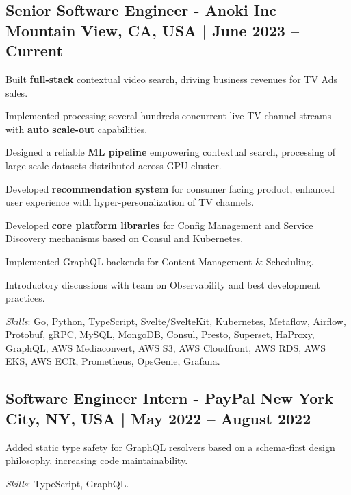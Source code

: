 \subsection{{Senior Software Engineer - Anoki Inc \hfill  Mountain View, CA, USA  | June 2023 -- Current}}
\begin{zitemize}
\item Built \textbf{full-stack} contextual video search, driving business revenues for TV Ads sales.
\item Implemented processing several hundreds concurrent live TV channel streams with \textbf{auto scale-out} capabilities.
\item Designed a reliable \textbf{ML pipeline} empowering contextual search, processing of large-scale datasets distributed across GPU cluster. 
\item Developed \textbf{recommendation system} for consumer facing product, enhanced user experience with hyper-personalization of TV channels.
\item Developed \textbf{core platform libraries} for Config Management and Service Discovery mechanisms based on Consul and Kubernetes.
\item Implemented GraphQL backends for Content Management \& Scheduling.
\item Introductory discussions with team on Observability and best development practices.
\end{zitemize}
\textit{Skills}: Go, Python, TypeScript, Svelte/SvelteKit, Kubernetes, Metaflow, Airflow, Protobuf, gRPC, MySQL, MongoDB, Consul, Presto, Superset, HaProxy, GraphQL, AWS Mediaconvert, AWS S3, AWS Cloudfront, AWS RDS, AWS EKS, AWS ECR, Prometheus, OpsGenie, Grafana.
\vspace*{2mm}
\subsection{{Software Engineer Intern - PayPal \hfill New York City, NY, USA | May 2022 -- August 2022}}
\begin{zitemize}
\item Added static type safety for GraphQL resolvers based on a schema-first design philosophy, increasing code maintainability.
\end{zitemize}

\textit{Skills}: TypeScript, GraphQL.
\vspace*{1mm}


